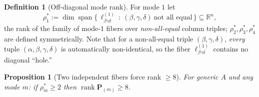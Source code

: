\documentclass[12pt]{article}
\DeclareMathOperator{\rank}{rank}
\DeclareMathOperator{\spanop}{span}
\newcommand{\bR}{\mathbb{R}}
\newtheorem{proposition}{Proposition}
\theoremstyle{definition}
\newtheorem{definition}{Definition}
\begin{document}
\begin{definition}[Off-diagonal mode rank]\label{def:rhostar}
For mode $1$ let
\[
\rho_1^\ast:=\dim\spanop\bigl\{\,\ell^{(1)}_{\beta\gamma\delta}\ :\ (\beta,\gamma,\delta)\ \text{not all equal}\,\bigr\}\subseteq\bR^n,
\]
the rank of the family of mode-$1$ fibers over \emph{non-all-equal} column triples;
$\rho_2^\ast,\rho_3^\ast,\rho_4^\ast$ are defined symmetrically.  Note that for a
non-all-equal triple $(\beta,\gamma,\delta)$, \emph{every} tuple
$(\alpha,\beta,\gamma,\delta)$ is automatically non-identical, so the fiber
$\ell^{(1)}_{\beta\gamma\delta}$ contains no diagonal ``hole.''
\end{definition}

\begin{proposition}[Two independent fibers force rank $\ge8$]\label{prop:lower}
For generic $A$ and any mode $m$: if $\rho_m^\ast\ge2$ then $\rank\mathbf P_{(m)}\ge8$.
\end{proposition}
\end{document}
